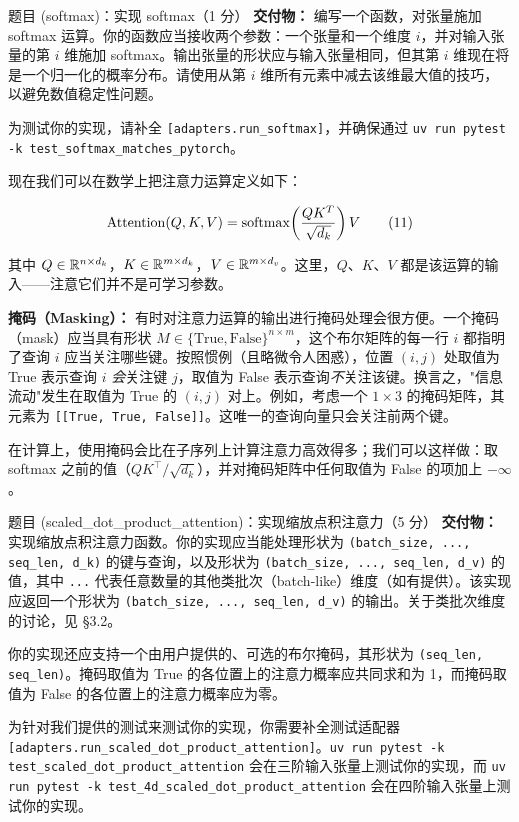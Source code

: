 \begin{problembox}{题目 (softmax)：实现 softmax（1 分）}
\textbf{交付物：} 编写一个函数，对张量施加 softmax 运算。你的函数应当接收两个参数：一个张量和一个维度 $i$，并对输入张量的第 $i$ 维施加 softmax。输出张量的形状应与输入张量相同，但其第 $i$ 维现在将是一个归一化的概率分布。请使用从第 $i$ 维所有元素中减去该维最大值的技巧，以避免数值稳定性问题。

为测试你的实现，请补全 \texttt{[adapters.run\_softmax]}，并确保通过 \texttt{uv run pytest -k test\_softmax\_matches\_pytorch}。
\end{problembox}

现在我们可以在数学上把注意力运算定义如下：

\begin{equation*}
\mathrm{Attention}(Q, K, V) = \operatorname{softmax}\!\left(\frac{QK^{T}}{\sqrt{d_k}}\right) V
\tag{11}
\end{equation*}

其中 $Q \in \mathbb{R}^{n \times d_k}$，$K \in \mathbb{R}^{m \times d_k}$，$V \in \mathbb{R}^{m \times d_v}$。这里，$Q$、$K$、$V$ 都是该运算的输入——注意它们并不是可学习参数。

\textbf{掩码（Masking）：} 有时对注意力运算的输出进行掩码处理会很方便。一个掩码（mask）应当具有形状 $M \in \{\text{True}, \text{False}\}^{n \times m}$，这个布尔矩阵的每一行 $i$ 都指明了查询 $i$ 应当关注哪些键。按照惯例（且略微令人困惑），位置 $(i, j)$ 处取值为 True 表示查询 $i$ \emph{会}关注键 $j$，取值为 False 表示查询\emph{不}关注该键。换言之，"信息流动"发生在取值为 True 的 $(i, j)$ 对上。例如，考虑一个 $1 \times 3$ 的掩码矩阵，其元素为 \texttt{[[True, True, False]]}。这唯一的查询向量只会关注前两个键。

在计算上，使用掩码会比在子序列上计算注意力高效得多；我们可以这样做：取 softmax 之前的值（$QK^{\top}/\sqrt{d_k}$），并对掩码矩阵中任何取值为 False 的项加上 $-\infty$。

\begin{problembox}{题目 (scaled\_dot\_product\_attention)：实现缩放点积注意力（5 分）}
\textbf{交付物：} 实现缩放点积注意力函数。你的实现应当能处理形状为 \texttt{(batch\_size, ..., seq\_len, d\_k)} 的键与查询，以及形状为 \texttt{(batch\_size, ..., seq\_len, d\_v)} 的值，其中 \texttt{...} 代表任意数量的其他类批次（batch-like）维度（如有提供）。该实现应返回一个形状为 \texttt{(batch\_size, ..., seq\_len, d\_v)} 的输出。关于类批次维度的讨论，见 §3.2。

你的实现还应支持一个由用户提供的、可选的布尔掩码，其形状为 \texttt{(seq\_len, seq\_len)}。掩码取值为 True 的各位置上的注意力概率应共同求和为 1，而掩码取值为 False 的各位置上的注意力概率应为零。

为针对我们提供的测试来测试你的实现，你需要补全测试适配器 \texttt{[adapters.run\_scaled\_dot\_product\_attention]}。\texttt{uv run pytest -k test\_scaled\_dot\_product\_attention} 会在三阶输入张量上测试你的实现，而 \texttt{uv run pytest -k test\_4d\_scaled\_dot\_product\_attention} 会在四阶输入张量上测试你的实现。
\end{problembox}

